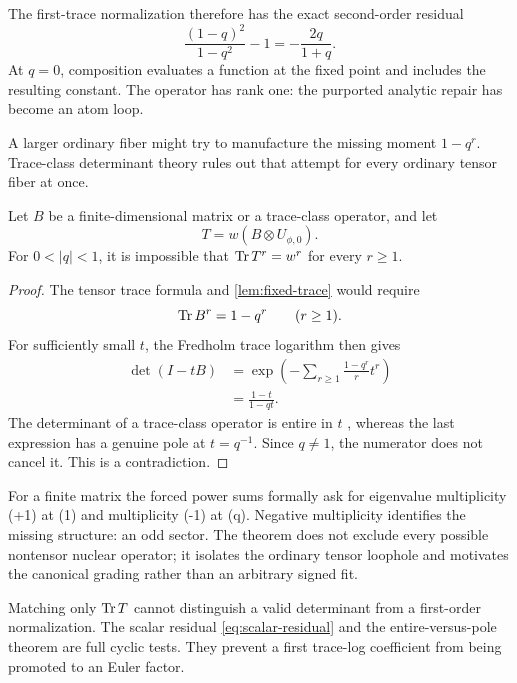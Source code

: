 The first-trace normalization therefore has the exact second-order residual
\begin{equation}
 \frac{(1-q)^2}{1-q^2}-1=-\frac{2q}{1+q}.
 \label{eq:scalar-residual}
\end{equation}
At \(q=0\), composition evaluates a function at the fixed point and includes
the resulting constant.  The operator has rank one: the purported analytic
repair has become an atom loop.

A larger ordinary fiber might try to manufacture the missing moment
\(1-q^r\).  Trace-class determinant theory rules out that attempt for every
ordinary tensor fiber at once.

\begin{theorem}
\label{thm:tensor-rigidity}
Let \(B\) be a finite-dimensional matrix or a trace-class operator, and let
\[
        T=w(B\otimes U_{\phi,0}).
\]
For \(0<|q|<1\), it is impossible that
\(\operatorname{Tr} T^r=w^r\) for every \(r\ge1\).
\end{theorem}

\begin{proof}
The tensor trace formula and \cref{lem:fixed-trace} would require
\[
        \operatorname{Tr} B^r=1-q^r
        \qquad(r\ge1).
\]
For sufficiently small \(t\), the Fredholm trace logarithm then gives
\begin{align*}
 \det(I-tB)
 &=\exp\left(-\sum_{r\ge1}\frac{1-q^r}{r}t^r\right)\\
 &=\frac{1-t}{1-qt}.
\end{align*}
The determinant of a trace-class operator is entire in \(t\)
\citep{Simon1977}, whereas the last expression has a genuine pole at
\(t=q^{-1}\).  Since \(q\ne1\), the numerator does not cancel it.  This is a
contradiction.
\end{proof}

For a finite matrix the forced power sums formally ask for eigenvalue
multiplicity (+1) at (1) and multiplicity (-1) at (q).  Negative
multiplicity identifies the missing structure: an odd sector.  The theorem
does not exclude every possible nontensor nuclear operator; it isolates the
ordinary tensor loophole and motivates the canonical grading rather than an
arbitrary signed fit.

\begin{remark}
Matching only \(\operatorname{Tr} T\) cannot distinguish a valid determinant from a
first-order normalization.  The scalar residual \eqref{eq:scalar-residual}
and the entire-versus-pole theorem are full cyclic tests.  They prevent a
first trace-log coefficient from being promoted to an Euler factor.
\end{remark}
